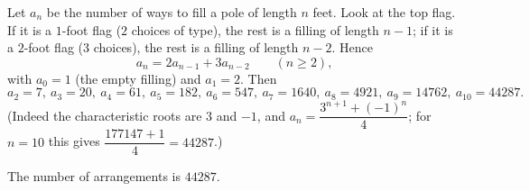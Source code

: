 Let $a_n$ be the number of ways to fill a pole of length $n$ feet. Look at the top flag. If it is a $1$-foot flag ($2$ choices of type), the rest is a filling of length $n-1$; if it is a $2$-foot flag ($3$ choices), the rest is a filling of length $n-2$. Hence
\[a_n=2a_{n-1}+3a_{n-2}\qquad(n\ge 2),\]
with $a_0=1$ (the empty filling) and $a_1=2$. Then
\[a_2=7,\ a_3=20,\ a_4=61,\ a_5=182,\ a_6=547,\ a_7=1640,\ a_8=4921,\ a_9=14762,\ a_{10}=44287 .\]
(Indeed the characteristic roots are $3$ and $-1$, and $a_n=\dfrac{3^{n+1}+(-1)^n}{4}$; for $n=10$ this gives $\dfrac{177147+1}{4}=44287$.)

The number of arrangements is $\boxed{44287}$.
